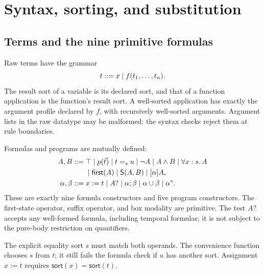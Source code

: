 \section{Syntax, sorting, and substitution}\label{sec:syntax}

\subsection{Terms and the nine primitive formulas}
Raw terms have the grammar
\[
 t\mathrel{::=} x\mid f(t_1,\ldots,t_n).
\]
The result sort of a variable is its declared sort, and that of a function
application is the function's result sort. A well-sorted application has
exactly the argument profile declared by $f$, with recursively well-sorted
arguments. Argument lists in the raw datatype may be malformed; the syntax
checks reject them at rule boundaries.

Formulas and programs are mutually defined:
\begin{align*}
 A,B\mathrel{::=}{}&\top\mid p(\vec t)\mid t=_s u\mid\neg A\mid A\land B
     \mid\forall x:s.\,A\\
     &\mid\mathsf{first}(A)\mid\mathsf{S}(A,B)\mid[\alpha]A,\\
 \alpha,\beta\mathrel{::=}{}&x:=t\mid A?\mid\alpha;\beta
     \mid\alpha\cup\beta\mid\alpha^*.
\end{align*}
These are exactly nine formula constructors and five program constructors.
The first-state operator, suffix operator, and box modality are primitive.
The test $A?$ accepts any well-formed formula, including temporal formulas;
it is not subject to the pure-body restriction on quantifiers.

The explicit equality sort $s$ must match both operands. The convenience
function  chooses $s$ from $t$; it still fails the formula
check if $u$ has another sort. Assignment $x:=t$ requires
$\mathsf{sort}(x)=\mathsf{sort}(t)$.

